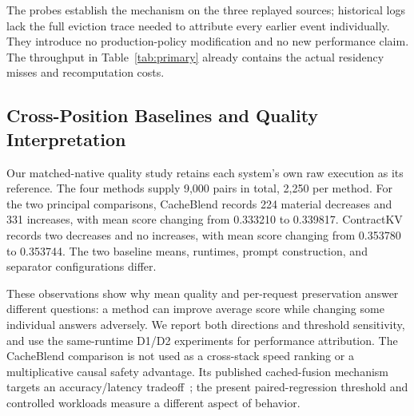 The probes establish the mechanism on the three replayed sources; historical logs lack the full eviction trace needed to attribute every earlier event individually. They introduce no production-policy modification and no new performance claim. The throughput in Table~\ref{tab:primary} already contains the actual residency misses and recomputation costs.

\subsection{Cross-Position Baselines and Quality Interpretation}
\label{sec:baselines}
Our matched-native quality study retains each system's own raw execution as its reference. The four methods supply 9,000 pairs in total, 2,250 per method. For the two principal comparisons, CacheBlend records 224 material decreases and 331 increases, with mean score changing from 0.333210 to 0.339817. ContractKV records two decreases and no increases, with mean score changing from 0.353780 to 0.353744. The two baseline means, runtimes, prompt construction, and separator configurations differ.

These observations show why mean quality and per-request preservation answer different questions: a method can improve average score while changing some individual answers adversely. We report both directions and threshold sensitivity, and use the same-runtime D1/D2 experiments for performance attribution. The CacheBlend comparison is not used as a cross-stack speed ranking or a multiplicative causal safety advantage. Its published cached-fusion mechanism targets an accuracy/latency tradeoff~\cite{cacheblend2025}; the present paired-regression threshold and controlled workloads measure a different aspect of behavior.
